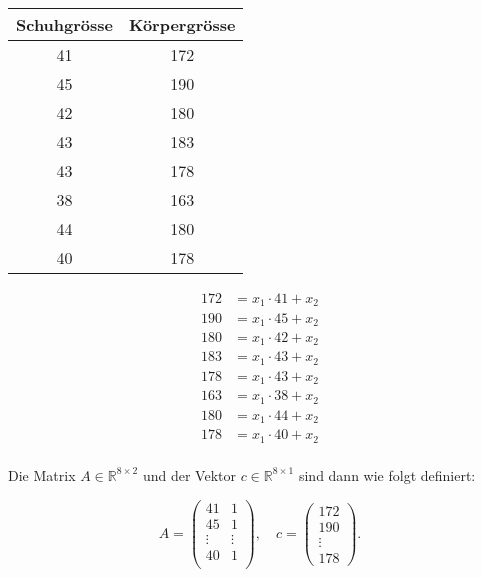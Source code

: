 \begin{minipage}
    {0.5\textwidth}
    \centering
        \begin{tabular}{|c|c|}
            \hline
            Schuhgrösse & Körpergrösse \\
            \hline
            41 & 172 \\
            45 & 190 \\
            42 & 180 \\
            43 & 183 \\
            43 & 178 \\
            38 & 163 \\
            44 & 180 \\
            40 & 178 \\
            \hline
        \end{tabular}
\end{minipage}
\hfill
\begin{minipage}
    {0.45\textwidth}
    \centering
    \begin{equation*}
        \begin{aligned}
            172 &= x_1\cdot 41 + x_2\\
            190 &= x_1\cdot 45 + x_2\\
            180 &= x_1\cdot 42 + x_2\\
            183 &= x_1\cdot 43 + x_2\\
            178 &= x_1\cdot 43 + x_2\\
            163 &= x_1\cdot 38 + x_2\\
            180 &= x_1\cdot 44 + x_2\\
            178 &= x_1\cdot 40 + x_2\\
        \end{aligned}
    \end{equation*}
\end{minipage}

\vspace{1\baselineskip}

Die Matrix \( A \in \mathbb{R}^{8 \times 2} \) und der Vektor \( c \in \mathbb{R}^{8 \times 1} \) sind dann wie folgt definiert:

\begin{equation*}
    A = \begin{pmatrix}
        41 & 1 \\
        45 & 1 \\
        \vdots & \vdots \\
        40 & 1 \\
    \end{pmatrix}, \quad
    c = \begin{pmatrix}
        172 \\ 190 \\ \vdots \\ 178
    \end{pmatrix}.
\end{equation*}



